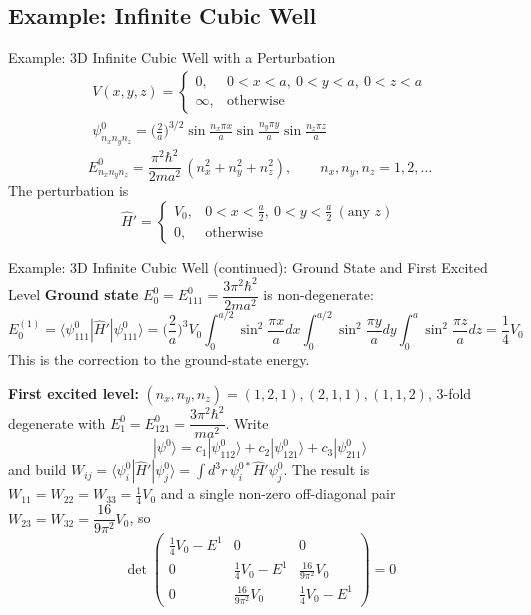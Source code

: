 \documentclass[11pt,a4paper]{article}
\begin{document}
\subsection{Example: Infinite Cubic Well}
\begin{prob}{Example: 3D Infinite Cubic Well with a Perturbation}
\begin{gather*}
V(x,y,z) = \begin{cases} 0, & 0<x<a,\ 0<y<a,\ 0<z<a\\ \infty, & \text{otherwise}\end{cases}\\
\psi^0_{n_xn_yn_z} = \Big(\frac2a\Big)^{3/2}\sin\frac{n_x\pi x}{a}\sin\frac{n_y\pi y}{a}\sin\frac{n_z\pi z}{a}
\end{gather*}
\[
E^0_{n_xn_yn_z} = \frac{\pi^2\hbar^2}{2ma^2}\,(n_x^2+n_y^2+n_z^2), \qquad n_x,n_y,n_z = 1,2,\ldots
\]
The perturbation is
\[
\hat H' = \begin{cases} V_0, & 0<x<\tfrac a2,\ 0<y<\tfrac a2\ (\text{any } z)\\ 0, & \text{otherwise}\end{cases}
\]
\begin{center}
\end{center}
\end{prob}

\begin{prob}{Example: 3D Infinite Cubic Well (continued): Ground State and First Excited Level}
\textbf{Ground state} $E_0^0 = E^0_{111} = \dfrac{3\pi^2\hbar^2}{2ma^2}$ is non-degenerate:
\[
E_0^{(1)} = \langle\psi^0_{111}|\hat H'|\psi^0_{111}\rangle = \Big(\frac2a\Big)^3V_0\int_0^{a/2}\!\sin^2\frac{\pi x}{a}dx\int_0^{a/2}\!\sin^2\frac{\pi y}{a}dy\int_0^a\!\sin^2\frac{\pi z}{a}dz = \frac14 V_0
\]
This is the correction to the ground-state energy.

\textbf{First excited level:} $(n_x,n_y,n_z) = (1,2,1),(2,1,1),(1,1,2)$, 3-fold degenerate with $E_1^0 = E^0_{121} = \dfrac{3\pi^2\hbar^2}{ma^2}$. Write
\[
|\psi^0\rangle = c_1|\psi^0_{112}\rangle + c_2|\psi^0_{121}\rangle + c_3|\psi^0_{211}\rangle
\]
and build $W_{ij}=\langle\psi^0_i|\hat H'|\psi^0_j\rangle=\int d^3r\,\psi_i^{0*}\hat H'\psi_j^0$. The result is $W_{11}=W_{22}=W_{33}=\tfrac14V_0$ and a single non-zero off-diagonal pair $W_{23}=W_{32}=\dfrac{16}{9\pi^2}V_0$, so
\[
\det\begin{pmatrix}\tfrac14V_0 - E^1 & 0 & 0\\ 0 & \tfrac14V_0 - E^1 & \tfrac{16}{9\pi^2}V_0\\ 0 & \tfrac{16}{9\pi^2}V_0 & \tfrac14V_0 - E^1\end{pmatrix} = 0
\]
\end{prob}
\end{document}
